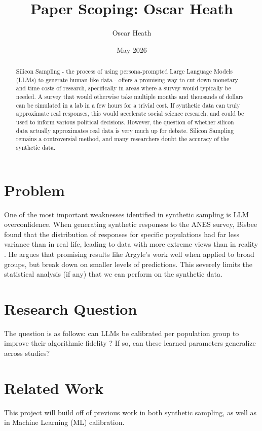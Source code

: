 \documentclass{scrartcl}
\title{Paper Scoping: Oscar Heath}
\author{Oscar Heath}
\date{May 2026}
\begin{document}
\maketitle
\begin{abstract}
    Silicon Sampling - the process of using persona-prompted Large Language Models (LLMs) to generate human-like data \cite{Argyle} - offers a promising way to cut down monetary and time costs of research, specifically in areas where a survey would typically be needed. A survey that would otherwise take multiple months and thousands of dollars can be simulated in a lab in a few hours for a trivial cost. If synthetic data can truly approximate real responses, this would accelerate social science research, and could be used to inform various political decisions. However, the question of whether silicon data actually approximates real data is very much up for debate. Silicon Sampling remains a controversial method, and many researchers doubt the accuracy of the synthetic data.
\end{abstract}

\section{Problem}
One of the most important weaknesses identified in synthetic sampling is LLM overconfidence. When generating synthetic responses to the ANES survey, Bisbee found that the distribution of responses for specific populations had far less variance than in real life, leading to data with more extreme views than in reality \cite{Bisbee}. He argues that promising results like Argyle's \cite{Argyle} work well when applied to broad groups, but break down on smaller levels of predictions. This severely limits the statistical analysis (if any) that we can perform on the synthetic data.

\section{Research Question}
The question is as follows: can LLMs be calibrated per population group to improve their algorithmic fidelity \cite{Argyle}? If so, can these learned parameters generalize across studies? 

\section{Related Work}
This project will build off of previous work in both synthetic sampling, as well as in Machine Learning (ML) calibration.
\end{document}

